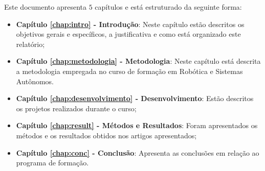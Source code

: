 Este documento apresenta $5$ capítulos e está estruturado da seguinte forma:

\begin{itemize}

  \item \textbf{Capítulo \ref{chap:intro} - Introdução}: Neste capítulo estão descritos os objetivos gerais e específicos, a justificativa e como está organizado este relatório;
  \item \textbf{Capítulo \ref{chap:metodologia} - Metodologia}: Neste capítulo está descrita a metodologia empregada no curso de formação em Robótica e Sistemas Autônomos. 
  \item \textbf{Capítulo \ref{chap:desenvolvimento} - Desenvolvimento}: Estão descritos os projetos realizados durante o curso;
  \item \textbf{Capítulo \ref{chap:result} - Métodos e Resultados}: Foram apresentados os métodos e os resultados obtidos nos artigos apresentados;
  \item \textbf{Capítulo \ref{chap:conc} - Conclusão}: Apresenta as conclusões em relação ao programa de formação.

\end{itemize}